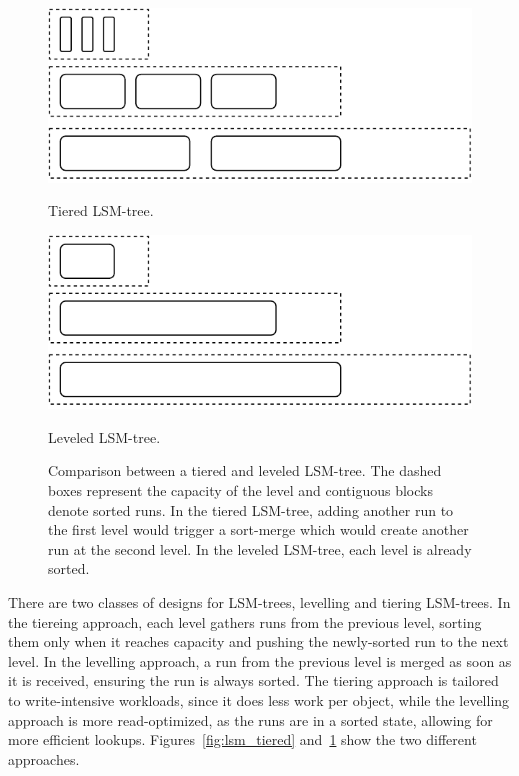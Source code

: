 \begin{figure}[t]
    \begin{minipage}[t]{0.45\linewidth}
        \centering
        \includegraphics[width=\linewidth]{img/lsm_tiered}
        \caption{Tiered \ac{LSM-tree}.}\label{fig:lsm_tiered}
    \end{minipage}
    \begin{minipage}[t]{0.45\linewidth}
        \centering
        \includegraphics[width=\linewidth]{img/lsm_leveled}
        \caption{Leveled \ac{LSM-tree}.}\label{fig:lsm_leveled}
    \end{minipage}
    \caption{Comparison between a tiered and leveled
    \ac{LSM-tree}. The dashed boxes represent the capacity of the
    level and contiguous blocks denote sorted runs. In the tiered
    \ac{LSM-tree}, adding another run to the first level would
    trigger a sort-merge which would create another run at the
    second level. In the leveled \ac{LSM-tree}, each level is already sorted. }
\end{figure}

There are two classes of designs for \acp{LSM-tree}, levelling
and tiering \acp{LSM-tree}. In the tiereing approach, each level
gathers runs from the previous level, sorting them only when it
reaches capacity and pushing the newly-sorted run to the next
level. In the levelling approach, a run from the previous level
is merged as soon as it is received, ensuring the run is always
sorted. The tiering approach is tailored to write-intensive
workloads, since it does less work per object, while the
levelling approach is more read-optimized, as the runs are in a
sorted state, allowing for more efficient lookups.
Figures~\ref{fig:lsm_tiered} and~\ref{fig:lsm_leveled} show the
two different approaches.


